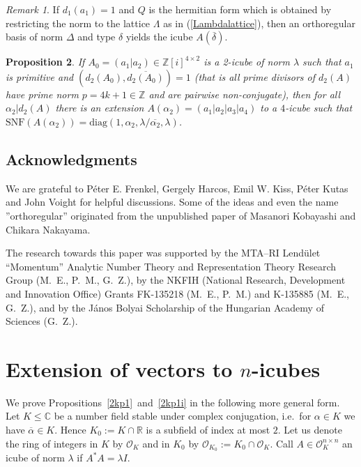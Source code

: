 \documentclass[11pt]{amsart}
\newcommand{\diag}{\mathrm{diag}}
\newcommand{\SNF}{\mathrm{SNF}}
\newtheorem{proposition}{Proposition}[section]
\theoremstyle{definition}
\theoremstyle{remark}
\newtheorem{remark}[proposition]{Remark}
\begin{document}
\begin{remark}
If $d_1(a_1)=1$ and $Q$ is the hermitian form which is obtained by restricting the norm to the lattice $\Lambda$ as in (\ref{Lambdalattice}), then an orthoregular basis of norm $\Delta$ and type $\delta$ yields the icube $A(\overline\delta)$.
\end{remark}

\begin{proposition}\label{4Zip}
If $A_0=(a_1|a_2)\in\mathbb Z[i]^{4\times 2}$ is a 2-icube of norm $\lambda$ such that $a_1$ is primitive and $(d_2(A_0),\overline{d_2(A_0)})=1$ (that is all prime divisors of $d_2(A)$ have prime norm $p=4k+1\in\mathbb Z$ and are pairwise non-conjugate), then for all $\alpha_2|d_2(A)$ there is an extension $A(\alpha_2)=(a_1|a_2|a_3|a_4)$ to a $4$-icube such that $\SNF(A(\alpha_2))=\diag(1,\alpha_2,\lambda/\overline{\alpha_2},\lambda)$.
\end{proposition}


\subsection*{Acknowledgments} We are grateful to Péter E. Frenkel, Gergely Harcos, Emil W. Kiss, Péter Kutas and John Voight for helpful discussions. Some of the ideas and even the name ''orthoregular'' originated from the unpublished paper \cite{KobayashiNakayama} of Masanori Kobayashi and Chikara Nakayama.

The research towards this paper was supported by the MTA–RI Lendület ``Momentum'' Analytic Number Theory and Representation Theory Research Group (M.\ E., P.\ M., G.\ Z.), by the NKFIH (National Research, Development and Innovation Office) Grants FK-135218 (M.\ E., P.\ M.) and K-135885 (M.\ E., G.\ Z.), and by the János Bolyai Scholarship of the Hungarian Academy of Sciences (G.\ Z.).

\section{Extension of vectors to \texorpdfstring{$n$}{n}-icubes }


We prove Propositions~\ref{2kp1}~and~\ref{2kp1i} in the following more general form. Let $K\leq\mathbb{C}$ be a number field stable under complex conjugation, i.e.~for  $\alpha\in K$ we have $\overline{\alpha}\in K$. Hence $K_0:=K\cap\mathbb R$ is a subfield of index at most $2$. Let us denote the ring of integers in $K$ by $\mathcal O_K$ and in $K_0$ by $\mathcal O_{K_0}:=K_0\cap \mathcal{O}_K$. Call $A\in \mathcal{O}_K^{n\times n}$ an icube of norm $\lambda$ if $A^*A=\lambda I$.
\end{document}
